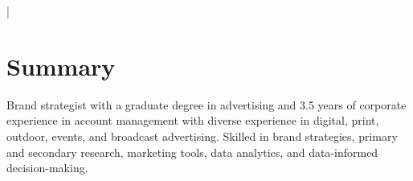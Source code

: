 \documentclass[letterpaper,10pt]{article}
\begin{document}
{\scshape\huge\Author}\vspace{2pt}

\begin{small}
  \href{\AuthorWebsiteLink}{\AuthorWebsiteText}

  \vspace{2pt}\AuthorAddress

  \vspace{1pt}\href{mailto:\AuthorEmail}{\AuthorEmail} |
  \href{\AuthorPhoneLink}{\AuthorPhoneText}
\end{small}

\section{Summary}
Brand strategist with a graduate degree in advertising and 3.5 years of
corporate experience in account management with diverse experience in digital,
print, outdoor, events, and broadcast advertising. Skilled in brand strategies,
primary and secondary research, marketing tools, data analytics, and
data-informed decision-making.

\vspace{-168.4pt}
\end{document}
